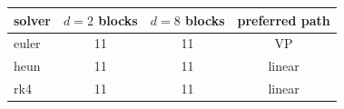 \begin{tabular}{lccc}
\toprule
solver & $d=2$ blocks & $d=8$ blocks & preferred path \\
\midrule
euler & 11 & 11 & VP \\
heun & 11 & 11 & linear \\
rk4 & 11 & 11 & linear \\
\bottomrule
\end{tabular}
